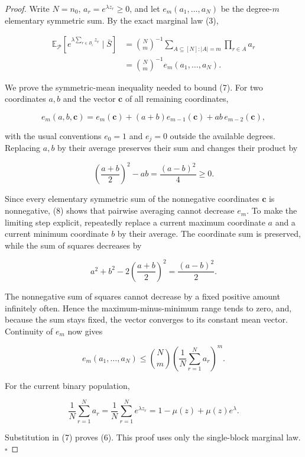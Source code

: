 \begin{proof}
Write \(N=n_0\), \(a_r=e^{\lambda z_r}\geq0\), and let
\(e_m(a_1,\ldots,a_N)\) be the degree-\(m\) elementary symmetric sum.
By the exact marginal law (3),

\[
\begin{aligned}
 \mathbb E_{\mathcal P}
 \left[e^{\lambda\sum_{r\in B_i}z_r}\mid\bar S\right]
 &=\binom Nm^{-1}
   \sum_{A\subseteq[N]:|A|=m}\prod_{r\in A}a_r\\
 &=\binom Nm^{-1}e_m(a_1,\ldots,a_N).
\end{aligned}
\tag{7}
\]

We prove the symmetric-mean inequality needed to bound (7).  For two
coordinates \(a,b\) and the vector \(\mathbf c\) of all remaining
coordinates,

\[
 e_m(a,b,\mathbf c)
 =e_m(\mathbf c)+(a+b)e_{m-1}(\mathbf c)
  +ab\,e_{m-2}(\mathbf c),
\tag{8}
\]

with the usual conventions \(e_0=1\) and \(e_j=0\) outside the available
degrees.  Replacing \(a,b\) by their average preserves their sum and changes
their product by

\[
 \left(\frac{a+b}{2}\right)^2-ab=\frac{(a-b)^2}{4}\geq0.
\]

Since every elementary symmetric sum of the nonnegative coordinates
\(\mathbf c\) is nonnegative, (8) shows that pairwise averaging cannot
decrease \(e_m\).  To make the limiting step explicit, repeatedly replace a
current maximum coordinate \(a\) and a current minimum coordinate \(b\) by
their average.  The coordinate sum is preserved, while the sum of squares
decreases by

\[
 a^2+b^2-2\left(\frac{a+b}{2}\right)^2
 =\frac{(a-b)^2}{2}.
\]

The nonnegative sum of squares cannot decrease by a fixed positive amount
infinitely often.  Hence the maximum-minus-minimum range tends to zero, and,
because the sum stays fixed, the vector converges to its constant mean
vector.  Continuity of \(e_m\) now gives

\[
 e_m(a_1,\ldots,a_N)
 \leq\binom Nm\left(\frac1N\sum_{r=1}^N a_r\right)^m.
\tag{9}
\]

For the current binary population,

\[
 \frac1N\sum_{r=1}^N a_r
 =\frac1N\sum_{r=1}^N e^{\lambda z_r}
 =1-\mu(z)+\mu(z)e^\lambda.
\]

Substitution in (7) proves (6).  This proof uses only the single-block
marginal law. \(\square\)


\end{proof}

